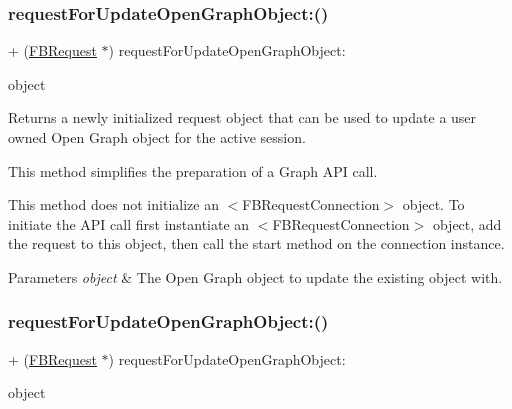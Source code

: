 \subsubsection{\texorpdfstring{request\+For\+Update\+Open\+Graph\+Object\+:()}{requestForUpdateOpenGraphObject:()}\hspace{0.1cm}{\footnotesize\ttfamily [3/5]}}
{\footnotesize\ttfamily + (\hyperlink{interfaceFBRequest}{F\+B\+Request} $\ast$) request\+For\+Update\+Open\+Graph\+Object\+: \begin{DoxyParamCaption}\item[{(id$<$ \hyperlink{protocolFBOpenGraphObject-p}{F\+B\+Open\+Graph\+Object} $>$)}]{object }\end{DoxyParamCaption}}

Returns a newly initialized request object that can be used to update a user owned Open Graph object for the active session.

This method simplifies the preparation of a Graph A\+PI call.

This method does not initialize an $<$\+F\+B\+Request\+Connection$>$ object. To initiate the A\+PI call first instantiate an $<$\+F\+B\+Request\+Connection$>$ object, add the request to this object, then call the {\ttfamily start} method on the connection instance.


\begin{DoxyParams}{Parameters}
{\em object} & The Open Graph object to update the existing object with. \\
\hline
\end{DoxyParams}
\mbox{\label{interfaceFBRequest_ab92e50866d79923cfb17f1f96f06530b}} 
\subsubsection{\texorpdfstring{request\+For\+Update\+Open\+Graph\+Object\+:()}{requestForUpdateOpenGraphObject:()}\hspace{0.1cm}{\footnotesize\ttfamily [4/5]}}
{\footnotesize\ttfamily + (\hyperlink{interfaceFBRequest}{F\+B\+Request} $\ast$) request\+For\+Update\+Open\+Graph\+Object\+: \begin{DoxyParamCaption}\item[{(id$<$ \hyperlink{protocolFBOpenGraphObject-p}{F\+B\+Open\+Graph\+Object} $>$)}]{object }\end{DoxyParamCaption}}

